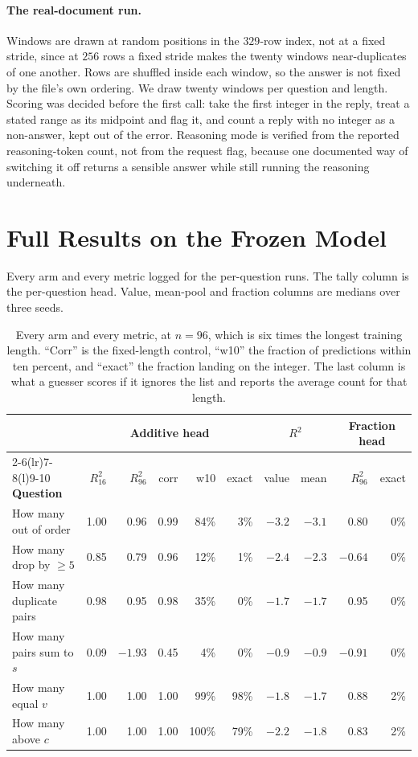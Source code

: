 \documentclass[10pt]{article}
\theoremstyle{definition}
\begin{document}
\begin{appendices}
\paragraph{The real-document run.} Windows are drawn at random positions in the $329$-row index, not at a
fixed stride, since at $256$ rows a fixed stride makes the twenty windows
near-duplicates of one another. Rows are shuffled inside each window, so
the answer is not fixed by the file's own ordering. We draw twenty windows per
question and length. Scoring was decided before
the first call: take the first integer in the reply, treat a stated range as
its midpoint and flag it, and count a reply with no integer as a non-answer, kept out of the error. Reasoning mode is verified from the reported reasoning-token count, not from the request flag, because one
documented way of switching it off returns a sensible answer while still
running the reasoning underneath.

\section{Full Results on the Frozen Model}
\label{app:qfull}

Every arm and every metric logged for the per-question runs. The tally
column is the per-question head. Value, mean-pool and fraction columns are
medians over three seeds.

\begin{table}[htbp]
\centering
\caption{Every arm and every metric, at $n = 96$, which is six times the
longest training length. ``Corr'' is the fixed-length control, ``w10'' the
fraction of predictions within ten percent, and ``exact'' the fraction
landing on the integer. The last column is what a guesser scores if it
ignores the list and reports the average count for that length.}
\label{tab:qfull}
\small
\begin{tabular}{@{}lrrrrrrrrr@{}}
\toprule
& \multicolumn{5}{c}{\textbf{Additive head}} & \multicolumn{2}{c}{\textbf{$R^2$}} & \multicolumn{2}{c}{\textbf{Fraction head}} \\
\cmidrule(lr){2-6}\cmidrule(lr){7-8}\cmidrule(l){9-10}
\textbf{Question} & $R^2_{16}$ & $R^2_{96}$ & corr & w10 & exact & value & mean & $R^2_{96}$ & exact \\
\midrule
How many out of order & 1.00 & 0.96 & 0.99 & 84\% & 3\% & $-3.2$ & $-3.1$ & 0.80 & 0\% \\
How many drop by $\ge 5$ & 0.85 & 0.79 & 0.96 & 12\% & 1\% & $-2.4$ & $-2.3$ & $-0.64$ & 0\% \\
How many duplicate pairs & 0.98 & 0.95 & 0.98 & 35\% & 0\% & $-1.7$ & $-1.7$ & 0.95 & 0\% \\
How many pairs sum to $s$ & 0.09 & $-1.93$ & 0.45 & 4\% & 0\% & $-0.9$ & $-0.9$ & $-0.91$ & 0\% \\
How many equal $v$ & 1.00 & 1.00 & 1.00 & 99\% & 98\% & $-1.8$ & $-1.7$ & 0.88 & 2\% \\
How many above $c$ & 1.00 & 1.00 & 1.00 & 100\% & 79\% & $-2.2$ & $-1.8$ & 0.83 & 2\% \\
\bottomrule
\end{tabular}
\end{table}


\end{appendices}
\end{document}
